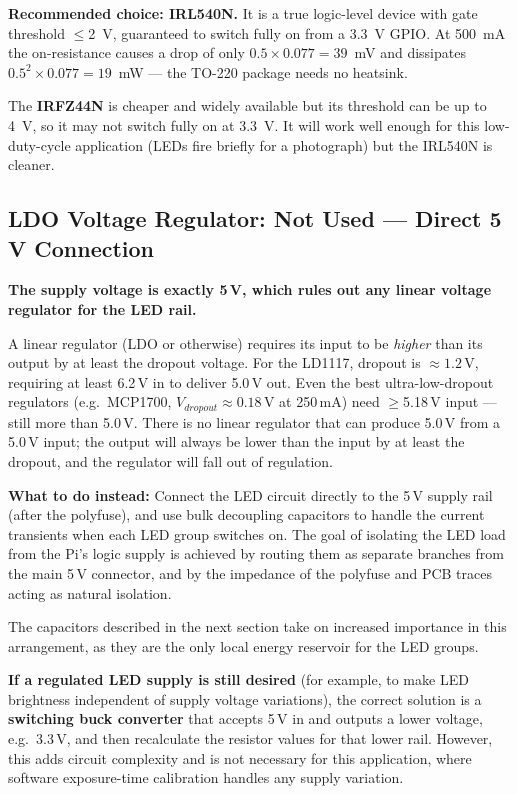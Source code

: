\documentclass[12pt,letterpaper]{article}
\begin{document}
\textbf{Recommended choice: IRL540N.} It is a true logic-level device with gate threshold
$\leq$2~V, guaranteed to switch fully on from a 3.3~V GPIO. At 500~mA the on-resistance
causes a drop of only $0.5 \times 0.077 = 39$~mV and dissipates $0.5^2 \times 0.077 = 19$~mW
--- the TO-220 package needs no heatsink.

The \textbf{IRFZ44N} is cheaper and widely available but its threshold can be up to 4~V,
so it may not switch fully on at 3.3~V. It will work well enough for this low-duty-cycle
application (LEDs fire briefly for a photograph) but the IRL540N is cleaner.

\subsection{LDO Voltage Regulator: Not Used --- Direct 5\,V Connection}

\textbf{The supply voltage is exactly 5\,V, which rules out any linear voltage regulator
for the LED rail.}

A linear regulator (LDO or otherwise) requires its input to be \emph{higher} than its
output by at least the dropout voltage. For the LD1117, dropout is $\approx 1.2$\,V,
requiring at least 6.2\,V in to deliver 5.0\,V out. Even the best ultra-low-dropout
regulators (e.g.\ MCP1700, $V_{dropout} \approx 0.18$\,V at 250\,mA) need $\geq$5.18\,V
input --- still more than 5.0\,V. There is no linear regulator that can produce 5.0\,V
from a 5.0\,V input; the output will always be lower than the input by at least the
dropout, and the regulator will fall out of regulation.

\textbf{What to do instead:} Connect the LED circuit directly to the 5\,V supply rail
(after the polyfuse), and use bulk decoupling capacitors to handle the current transients
when each LED group switches on. The goal of isolating the LED load from the Pi's logic
supply is achieved by routing them as separate branches from the main 5\,V connector,
and by the impedance of the polyfuse and PCB traces acting as natural isolation.

The capacitors described in the next section take on increased importance in this
arrangement, as they are the only local energy reservoir for the LED groups.

\textbf{If a regulated LED supply is still desired} (for example, to make LED brightness
independent of supply voltage variations), the correct solution is a \textbf{switching
buck converter} that accepts 5\,V in and outputs a lower voltage, e.g.\ 3.3\,V, and
then recalculate the resistor values for that lower rail. However, this adds circuit
complexity and is not necessary for this application, where software exposure-time
calibration handles any supply variation.
\end{document}
